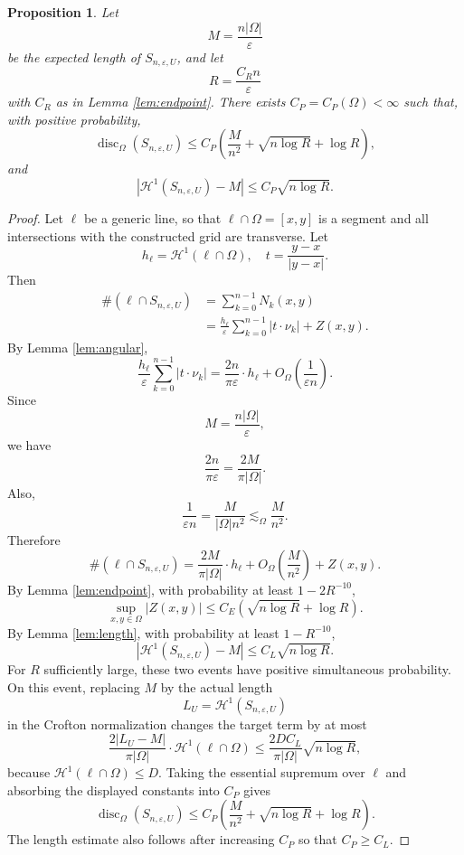 \documentclass[11pt]{article}
\newtheorem{proposition}[theorem]{Proposition}
\newcommand{\cH}{\mathcal H}
\newcommand{\eps}{\varepsilon}
\begin{document}
\begin{proposition}\label{prop:random}
Let
\[
        M=\frac{n|\Omega|}{\eps}
\]
be the expected length of $S_{n,\eps,U}$, and let
\[
        R=\frac{C_R n}{\eps}
\]
with $C_R$ as in Lemma \ref{lem:endpoint}. There exists $C_P=C_P(\Omega)<\infty$ such that, with positive probability,
\[
        \operatorname{disc}_\Omega(S_{n,\eps,U})
        \le
        C_P
        \left(
        \frac{M}{n^2}
        +
        \sqrt{n\log R}
        +
        \log R
        \right),
\]
and
\[
        \left|
        \cH^1(S_{n,\eps,U})-M
        \right|
        \le
        C_P\sqrt{n\log R}.
\]
\end{proposition}

\begin{proof}
Let $\ell$ be a generic line, so that $\ell\cap\Omega=[x,y]$ is a segment and all intersections with the constructed grid are transverse. Let
\[
        h_\ell=\cH^1(\ell\cap\Omega),
        \quad
        t=\frac{y-x}{|y-x|}.
\]
Then
\[
\begin{aligned}
        \#\left(\ell \cap {S_{n,\eps,U}}\right)
        &=
        \sum_{k=0}^{n-1}N_k(x,y)  \\
        &=
        \frac{h_\ell}{\eps}
        \sum_{k=0}^{n-1}|t\cdot\nu_k|
        +
        Z(x,y).
\end{aligned}
\]
By Lemma \ref{lem:angular},
\[
        \frac{h_\ell}{\eps}
        \sum_{k=0}^{n-1}|t\cdot\nu_k|
        =
        \frac{2n}{\pi\eps}\cdot h_\ell
        +
        O_\Omega\left(\frac1{\eps n}\right).
\]
Since
\[
        M=\frac{n|\Omega|}{\eps},
\]
we have
\[
        \frac{2n}{\pi\eps}
        =
        \frac{2M}{\pi|\Omega|}.
\]
Also,
\[
        \frac1{\eps n}
        =
        \frac{M}{|\Omega|n^2}
        \lesssim_\Omega \frac{M}{n^2}.
\]
Therefore
\[
          \#\left(\ell \cap {S_{n,\eps,U}}\right)
        =
        \frac{2M}{\pi|\Omega|}\cdot h_\ell
        +
        O_\Omega\left(\frac{M}{n^2}\right)
        +
        Z(x,y).
\]
By Lemma \ref{lem:endpoint}, with probability at least $1-2R^{-10}$,
\[
        \sup_{x,y\in\Omega}|Z(x,y)|
        \le
        C_E
        \left(
        \sqrt{n\log R}+\log R
        \right).
\]
By Lemma \ref{lem:length}, with probability at least $1-R^{-10}$,
\[
        \left|
        \cH^1(S_{n,\eps,U})-M
        \right|
        \le
        C_L\sqrt{n\log R}.
\]
For $R$ sufficiently large, these two events have positive simultaneous probability. On this event, replacing $M$ by the actual length
\[
        L_U=\cH^1(S_{n,\eps,U})
\]
in the Crofton normalization changes the target term by at most
\[
        \frac{2|L_U-M|}{\pi|\Omega|}\cdot
        \cH^1(\ell\cap\Omega)
        \le
        \frac{2DC_L}{\pi|\Omega|}\sqrt{n\log R},
\]
because $\cH^1(\ell\cap\Omega)\le D$. Taking the essential supremum over $\ell$ and absorbing the displayed constants into $C_P$ gives
\[
        \operatorname{disc}_\Omega(S_{n,\eps,U})
        \le
        C_P
        \left(
        \frac{M}{n^2}
        +
        \sqrt{n\log R}
        +
        \log R
        \right).
\]
The length estimate also follows after increasing $C_P$ so that $C_P\ge C_L$.
\end{proof}
\end{document}

